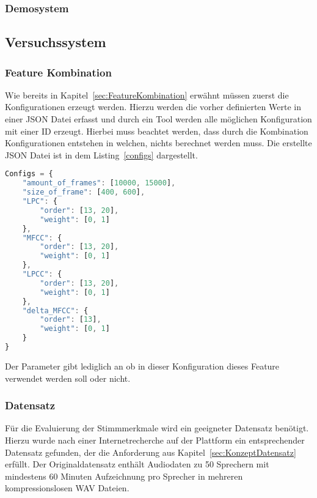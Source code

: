 \subsubsection{Demosystem}

\subsection{Versuchssystem}

\subsubsection{Feature Kombination}
Wie bereits in Kapitel~\ref{sec:FeatureKombination} erwähnt müssen zuerst die Konfigurationen erzeugt werden.
Hierzu werden die vorher definierten Werte in einer JSON Datei erfasst und durch ein Tool werden alle möglichen Konfiguration mit einer ID erzeugt.
Hierbei muss beachtet werden, dass durch die Kombination Konfigurationen entstehen in welchen, nichts berechnet werden muss.
Die erstellte JSON Datei ist in dem Listing~\ref{configs} dargestellt.
\begin{lstlisting}[language=JavaScript,numbers=none,caption=Konfigurationsmöglichkeiten,label=configs]
Configs = {
    "amount_of_frames": [10000, 15000],
    "size_of_frame": [400, 600],
    "LPC": {
        "order": [13, 20],
        "weight": [0, 1]
    },
    "MFCC": {
        "order": [13, 20],
        "weight": [0, 1]
    },
    "LPCC": {
        "order": [13, 20],
        "weight": [0, 1]
    },
    "delta_MFCC": {
        "order": [13],
        "weight": [0, 1]
    }
}
\end{lstlisting}
Der  Parameter gibt lediglich an ob in dieser Konfiguration dieses Feature verwendet werden soll oder nicht.

\subsubsection{Datensatz}
Für die Evaluierung der Stimmmerkmale wird ein geeigneter Datensatz benötigt.
Hierzu wurde nach einer Internetrecherche auf der Plattform  ein entsprechender Datensatz gefunden, der die Anforderung aus Kapitel~\ref{sec:KonzeptDatensatz} erfüllt. \autocite[vgl.][]{jain_speaker_2019}
Der Originaldatensatz enthält Audiodaten zu 50 Sprechern mit mindestens 60 Minuten Aufzeichnung pro Sprecher in mehreren kompressionslosen WAV Dateien.

